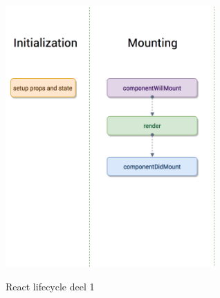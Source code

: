 \documentclass[fleqn,a4paper,12pt]{book}
\begin{document}


\inserttitlepage

\usechapterimagefalse



\pagestyle{empty} %
\tableofcontents %
\cleardoublepage %
\pagestyle{fancy} %


%

\listoffigures

\begin{figure}
	\begin{center}
		\caption{React lifecycle deel 1}
		\includegraphics[width=8cm]{img/react-lifecycle1}\\[0.5cm]
	\end{center}
\end{figure}
\end{document}
